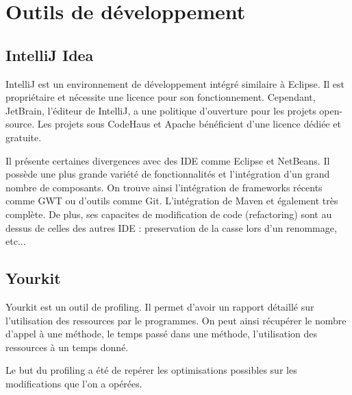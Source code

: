 


\section{Outils de développement}
\subsection{IntelliJ Idea}
IntelliJ est un environnement de développement intégré similaire à Eclipse. Il est propriétaire et nécessite une licence pour son fonctionnement. Cependant, JetBrain, l'éditeur de IntelliJ, a une politique d'ouverture pour les projets open-source. Les projets sous CodeHaus et Apache bénéficient d'une licence dédiée et gratuite. 

Il présente certaines divergences avec des IDE comme Eclipse et NetBeans. Il possède une plus grande variété de fonctionnalités et l'intégration d'un grand nombre de composants. On trouve ainsi l'intégration de frameworks récents comme GWT ou d'outils comme Git. L'intégration de Maven et également très complète.
De plus, ses capacites de modification de code (refactoring) sont au dessus de celles des autres IDE : preservation de la casse lors d'un renommage, etc...
\subsection{Yourkit}
Yourkit est un outil de profiling. Il permet d'avoir un rapport détaillé sur l'utilisation des ressources par le programmes. On peut ainsi récupérer le nombre d'appel à une méthode, le temps passé dans une méthode, l'utilisation des ressources à un temps donné.

Le but du profiling a été de repérer les optimisations possibles sur les modifications que l'on a opérées.